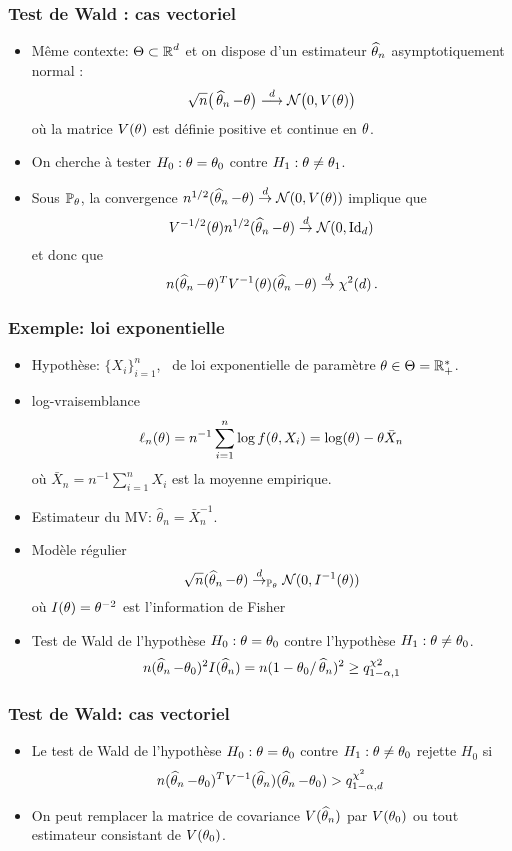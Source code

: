 \begin{frame}
\frametitle{Test de Wald : cas vectoriel}
\begin{itemize}
\item \alert{ Même contexte:} $\Theta \subset \operatorname{{\mathbb R}}^d$ et \alert{on dispose} d'un estimateur $\operatorname{\widehat \theta_{\mathnormal{n}}}$ asymptotiquement normal :
$$\sqrt{n}\big(\operatorname{\widehat \theta_{\mathnormal{n}}}-\theta\big)\stackrel{d}{\longrightarrow} {\mathcal N}\big(0, V(\theta)\big)$$
où la matrice $V(\theta)$ est \alert{définie positive} et continue en $\theta$.
\item On cherche à tester $H_0: \theta= \theta_0$ contre $H_1: \theta \ne \theta_1$.
\item Sous $\operatorname{{\mathbb P}}_\theta$, la convergence $n^{1/2} (\operatorname{\widehat \theta_{\mathnormal{n}}} - \theta) \stackrel{d}{\rightarrow} \mathcal{N}(0,V(\theta))$ implique que
$$
V^{-1/2}(\theta) n^{1/2} (\operatorname{\widehat \theta_{\mathnormal{n}}} - \theta) \stackrel{d}{\rightarrow} \mathcal{N}(0,\mathrm{Id}_{d})
$$
et donc que
$$
n (\operatorname{\widehat \theta_{\mathnormal{n}}} - \theta)^{T} V^{-1}(\theta) (\operatorname{\widehat \theta_{\mathnormal{n}}} - \theta) \stackrel{d}{\rightarrow} \chi^2(d)  \,.
$$
\end{itemize}
\end{frame}

\begin{frame}
\frametitle{Exemple: loi exponentielle}
\begin{itemize}
\item \alert{Hypothèse}: $\{X_i\}_{i=1}^n$, \iid\ de loi exponentielle de paramètre $\theta \in \Theta= \mathbb{R}_+^*$.
\item \alert{log-vraisemblance}
\[
\ell_n(\theta)= n^{-1} \sum_{i=1}^n \log f(\theta,X_i)= \log(\theta) - \theta \bar{X}_n
\]
où $\bar{X}_n= n^{-1} \sum_{i=1}^n X_i$ est la moyenne empirique.
\item Estimateur du MV: $\hat{\theta}_n = \bar{X}_n^{-1}$.
\item \alert{Modèle régulier}
\[
\sqrt{n} (\operatorname{\widehat \theta_{\mathnormal{n}}} - \theta) \stackrel{d}{\rightarrow}_{\operatorname{{\mathbb P}}_{\theta}} \mathcal{N}(0,I^{-1}(\theta))
\]
où $I(\theta)= \theta^{-2}$ est l'\alert{information de Fisher}
\item \alert{Test de Wald} de l'hypothèse $H_0: \theta = \theta_0$ contre l'hypothèse $H_1: \theta \ne \theta_0$.
\begin{align*}
n (\operatorname{\widehat \theta_{\mathnormal{n}}} - \theta_0)^2 I(\operatorname{\widehat \theta_{\mathnormal{n}}})= n (1 - \theta_0 / \operatorname{\widehat \theta_{\mathnormal{n}}})^2  \geq q^{\chi2}_{1-\alpha,1}
\end{align*}
\end{itemize}
\end{frame}


\begin{frame}
\frametitle{Test de Wald: cas vectoriel}
\begin{itemize}
\item Le test de Wald de l'hypothèse $H_0: \theta= \theta_0$ contre $H_1: \theta \ne \theta_0$
rejette $H_0$ si
\[
n (\operatorname{\widehat \theta_{\mathnormal{n}}} - \theta_0)^T V^{-1}(\operatorname{\widehat \theta_{\mathnormal{n}}}) (\operatorname{\widehat \theta_{\mathnormal{n}}} - \theta_0) > q^{\chi^2}_{1-\alpha,d} \,
\]
\item On peut remplacer la matrice de covariance $V(\operatorname{\widehat \theta_{\mathnormal{n}}})$ par $V(\theta_0)$ ou tout estimateur consistant de $V(\theta_0)$.
\end{itemize}
\end{frame}

